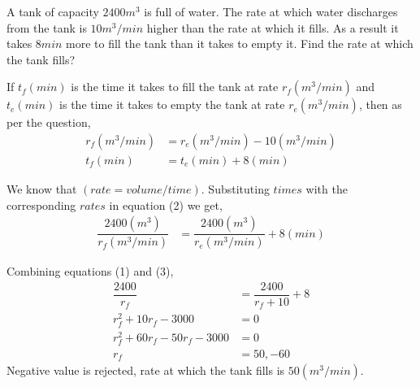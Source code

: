 

\question[4] A tank of capacity $2400m^3$ is full of water. The rate at which water discharges from the tank is $10m^3/min$ higher than the rate at which it fills. As a result it takes $8min$ more to fill the tank than it takes to empty it. Find the rate at which the tank fills?


\ifprintanswers
\fi 

\begin{solution}[\halfpage]
  If $t_f(min)$ is the time it takes to fill the tank at rate $r_f(m^3/min)$ and $t_e(min)$ is the time it takes to empty the tank at rate $r_e(m^3/min)$, then as per the question,
  \begin{align}
    r_f(m^3/min) &= r_e(m^3/min) - 10(m^3/min) \\
    t_f(min)     &= t_e(min)+8(min)
  \end{align}
  
  We know that $(rate=volume/time)$. Substituting $times$ with the corresponding $rates$ in equation (2) we get,
  \begin{align}
    \dfrac{2400(m^3)}{r_f(m^3/min)} &= 
    	\dfrac{2400(m^3)}{r_e(m^3/min)}+8(min) 
  \end{align}
  
  Combining equations (1) and (3),
  \begin{align}      
    \dfrac{2400}{r_f}               &= \dfrac{2400}{r_f+10}+8 \\
    r_f^2 + 10r_f - 3000            &= 0 \\
    r_f^2 + 60r_f -50r_f - 3000     &= 0 \\
    r_f                             &= 50, -60
  \end{align}
  Negative value is rejected, rate at which the tank fills is $50(m^3/min)$.
\end{solution}

